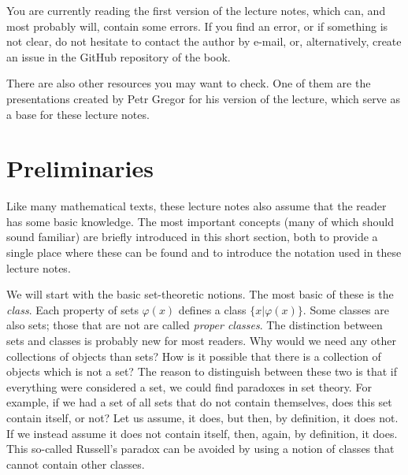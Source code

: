 You are currently reading the first version of the lecture notes, which can, and most probably will, contain some errors. If you find an error, or if something is not clear, do not hesitate to contact the author by e-mail, or, alternatively, create an issue in the GitHub repository of the book. 

There are also other resources you may want to check. One of them are the presentations created by Petr Gregor for his version of the lecture, which serve as a base for these lecture notes.


\section{Preliminaries}

Like many mathematical texts, these lecture notes also assume that the reader has some basic knowledge. The most important concepts (many of which should sound familiar) are briefly introduced in this short section, both to provide a single place where these can be found and to introduce the notation used in these lecture notes.

We will start with the basic set-theoretic notions. The most basic of these is the \emph{class}. Each property of sets $\varphi(x)$ defines a class $\{x|\varphi(x)\}$. Some classes are also sets; those that are not are called \emph{proper classes}. The distinction between sets and classes is probably new for most readers. Why would we need any other collections of objects than sets? How is it possible that there is a collection of objects which is not a set? The reason to distinguish between these two is that if everything were considered a set, we could find paradoxes in set theory. For example, if we had a set of all sets that do not contain themselves, does this set contain itself, or not? Let us assume, it does, but then, by definition, it does not. If we instead assume it does not contain itself, then, again, by definition, it does. This so-called Russell's paradox can be avoided by using a notion of classes that cannot contain other classes. 

